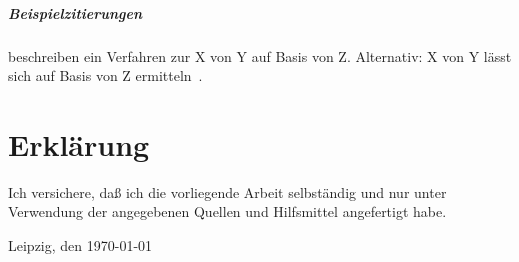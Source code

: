 \documentclass[headsepline,titlepage,twoside,12pt]{report}
\begin{document}
\paragraph{Beispielzitierungen}
\citet{his} beschreiben ein Verfahren zur X von Y auf Basis von Z.
Alternativ: X von Y lässt sich auf Basis von Z ermitteln~\citep{his}.




\chapter*{Erklärung}
Ich versichere, daß ich die vorliegende Arbeit selbständig und nur unter
Verwendung der angegebenen Quellen und Hilfsmittel angefertigt habe.

\vspace{9cm}

Leipzig, den \today

\vspace{3cm}

\makeatletter\@author\makeatother
\end{document}
